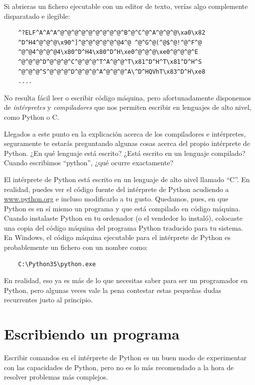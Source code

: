 Si abrieras un fichero ejecutable con un editor de texto, verías algo
complemente disparatado e ilegible:

\begin{verbatim}
    ^?ELF^A^A^A^@^@^@^@^@^@^@^@^@^B^@^C^@^A^@^@^@\xa0\x82
    ^D^H4^@^@^@\x90^]^@^@^@^@^@^@4^@ ^@^G^@(^@$^@!^@^F^@
    ^@^@4^@^@^@4\x80^D^H4\x80^D^H\xe0^@^@^@\xe0^@^@^@^E
    ^@^@^@^D^@^@^@^C^@^@^@^T^A^@^@^T\x81^D^H^T\x81^D^H^S
    ^@^@^@^S^@^@^@^D^@^@^@^A^@^@^@^A\^D^HQVhT\x83^D^H\xe8
    ....
\end{verbatim}

No resulta fácil leer o escribir código máquina, pero afortunadamente
disponemos de \emph{intérpretes} y \emph{compiladores} que nos permiten
escribir en lenguajes de alto nivel, como Python o C.

Llegados a este punto en la explicación acerca de los compiladores e
intérpretes, seguramente te estarás preguntando algunas cosas acerca del
propio intérprete de Python. ¿En qué lenguaje está escrito? ¿Está
escrito en un lenguaje compilado? Cuando escribimos ``python'', ¿qué
ocurre exactamente?

El intérprete de Python está escrito en un lenguaje de alto nivel
llamado ``C''. En realidad, puedes ver el código fuente del intérprete
de Python acudiendo a \href{http://www.python.org}{www.python.org} e
incluso modificarlo a tu gusto. Quedamos, pues, en que Python es en sí
mismo un programa y que está compilado en código máquina. Cuando
instalaste Python en tu ordenador (o el vendedor lo instaló), colocaste
una copia del código máquina del programa Python traducido para tu
sistema. En Windows, el código máquina ejecutable para el intérprete de
Python es probablemente un fichero con un nombre como:

\begin{verbatim}
    C:\Python35\python.exe
\end{verbatim}

En realidad, eso ya es más de lo que necesitas saber para ser un
programador en Python, pero algunas veces vale la pena contestar estas
pequeñas dudas recurrentes justo al principio.

\hypertarget{escribiendo-un-programa}{%
\section{Escribiendo un programa}\label{escribiendo-un-programa}}

Escribir comandos en el intérprete de Python es un buen modo de
experimentar con las capacidades de Python, pero no es lo más
recomendado a la hora de resolver problemas más complejos.

